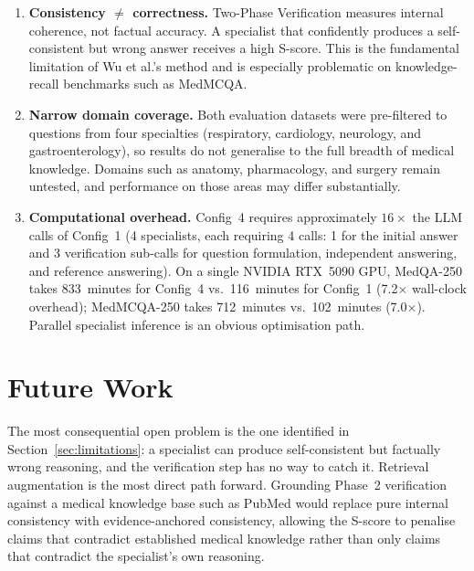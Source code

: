 \documentclass[10pt]{article}
\begin{document}
\begin{enumerate}
    \item \textbf{Consistency $\neq$ correctness.}  Two-Phase Verification
          measures internal coherence, not factual accuracy.  A specialist
          that confidently produces a self-consistent but wrong answer
          receives a high S-score.  This is the fundamental limitation of
          Wu et al.'s method and is especially problematic on knowledge-recall
          benchmarks such as MedMCQA.

    \item \textbf{Narrow domain coverage.}  Both evaluation datasets were
          pre-filtered to questions from four specialties (respiratory,
          cardiology, neurology, and gastroenterology), so results do not
          generalise to the full breadth of medical knowledge.  Domains such
          as anatomy, pharmacology, and surgery remain untested, and
          performance on those areas may differ substantially.

    \item \textbf{Computational overhead.}  Config~4 requires approximately
          $16\times$ the LLM calls of Config~1 (4 specialists, each requiring
          4 calls: 1 for the initial answer and 3 verification sub-calls for
          question formulation, independent answering, and reference answering).
          On a single NVIDIA RTX~5090 GPU, MedQA-250 takes 833~minutes for
          Config~4 vs.\ 116~minutes for Config~1 (7.2$\times$ wall-clock
          overhead); MedMCQA-250 takes 712~minutes vs.\ 102~minutes
          (7.0$\times$).  Parallel specialist inference is an obvious optimisation path.
\end{enumerate}

\section{Future Work}
\label{sec:future}

The most consequential open problem is the one identified in
Section~\ref{sec:limitations}: a specialist can produce self-consistent but
factually wrong reasoning, and the verification step has no way to catch it.
Retrieval augmentation is the most direct path forward.  Grounding Phase~2
verification against a medical knowledge base such as PubMed would replace
pure internal consistency with evidence-anchored consistency, allowing the
S-score to penalise claims that contradict established medical knowledge
rather than only claims that contradict the specialist's own reasoning.
\end{document}
